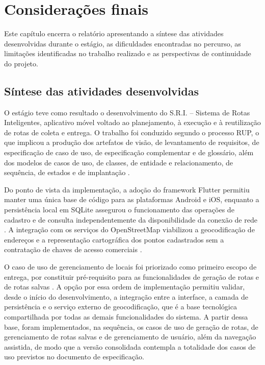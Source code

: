 \chapter{Considerações finais}\label{cap:consideracoes-finais}

Este capítulo encerra o relatório apresentando a síntese das atividades desenvolvidas durante o estágio, as dificuldades encontradas no percurso, as limitações identificadas no trabalho realizado e as perspectivas de continuidade do projeto.

\section{Síntese das atividades desenvolvidas}

O estágio teve como resultado o desenvolvimento do S.R.I. -- Sistema de Rotas Inteligentes, aplicativo móvel voltado ao planejamento, à execução e à reutilização de rotas de coleta e entrega. O trabalho foi conduzido segundo o processo RUP, o que implicou a produção dos artefatos de visão, de levantamento de requisitos, de especificação de caso de uso, de especificação complementar e de glossário, além dos modelos de casos de uso, de classes, de entidade e relacionamento, de sequência, de estados e de implantação \cite{kruchten2003}.

Do ponto de vista da implementação, a adoção do framework Flutter permitiu manter uma única base de código para as plataformas Android e iOS, enquanto a persistência local em SQLite assegurou o funcionamento das operações de cadastro e de consulta independentemente da disponibilidade da conexão de rede \cite{flutter2024, sqlite2024}. A integração com os serviços do OpenStreetMap viabilizou a geocodificação de endereços e a representação cartográfica dos pontos cadastrados sem a contratação de chaves de acesso comerciais \cite{osm2024}.

O caso de uso de gerenciamento de locais foi priorizado como primeiro escopo de entrega, por constituir pré-requisito para as funcionalidades de geração de rotas e de rotas salvas \cite{sriEspecUC2026}. A opção por essa ordem de implementação permitiu validar, desde o início do desenvolvimento, a integração entre a interface, a camada de persistência e o serviço externo de geocodificação, que é a base tecnológica compartilhada por todas as demais funcionalidades do sistema. A partir dessa base, foram implementados, na sequência, os casos de uso de geração de rotas, de gerenciamento de rotas salvas e de gerenciamento de usuário, além da navegação assistida, de modo que a versão consolidada contempla a totalidade dos casos de uso previstos no documento de especificação.


